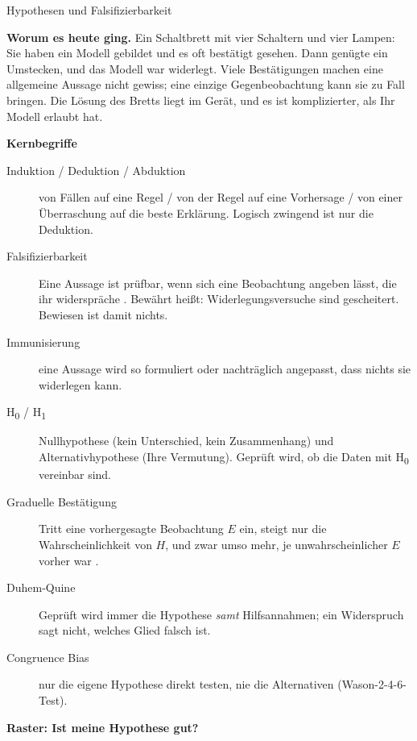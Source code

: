 \begin{handout}{Hypothesen und Falsifizierbarkeit}

\textbf{Worum es heute ging.} Ein Schaltbrett mit vier Schaltern und vier
Lampen: Sie haben ein Modell gebildet und es oft bestätigt gesehen. Dann
genügte ein Umstecken, und das Modell war widerlegt. Viele Bestätigungen
machen eine allgemeine Aussage nicht gewiss; eine einzige Gegenbeobachtung
kann sie zu Fall bringen. Die Lösung des Bretts liegt im Gerät, und es ist
komplizierter, als Ihr Modell erlaubt hat.

\textbf{Kernbegriffe}
\begin{description}
  \item[Induktion / Deduktion / Abduktion] von Fällen auf eine Regel /
    von der Regel auf eine Vorhersage / von einer Überraschung auf die
    beste Erklärung. Logisch zwingend ist nur die Deduktion.
  \item[Falsifizierbarkeit] Eine Aussage ist prüfbar, wenn sich eine
    Beobachtung angeben lässt, die ihr widerspräche
    \parencite{popper1934logik}. Bewährt heißt: Widerlegungsversuche sind
    gescheitert. Bewiesen ist damit nichts.
  \item[Immunisierung] eine Aussage wird so formuliert oder nachträglich
    angepasst, dass nichts sie widerlegen kann.
  \item[H\textsubscript{0} / H\textsubscript{1}] Nullhypothese (kein
    Unterschied, kein Zusammenhang) und Alternativhypothese (Ihre
    Vermutung). Geprüft wird, ob die Daten mit H\textsubscript{0}
    vereinbar sind.
  \item[Graduelle Bestätigung] Tritt eine vorhergesagte Beobachtung $E$
    ein, steigt nur die Wahrscheinlichkeit von $H$, und zwar umso mehr, je
    unwahrscheinlicher $E$ vorher war \parencite{horwich1982probability}.
  \item[Duhem-Quine] Geprüft wird immer die Hypothese \emph{samt}
    Hilfsannahmen; ein Widerspruch sagt nicht, welches Glied falsch ist.
  \item[Congruence Bias] nur die eigene Hypothese direkt testen, nie die
    Alternativen (Wason-2-4-6-Test).
\end{description}

\textbf{Raster: Ist meine Hypothese gut?}


\end{handout}
